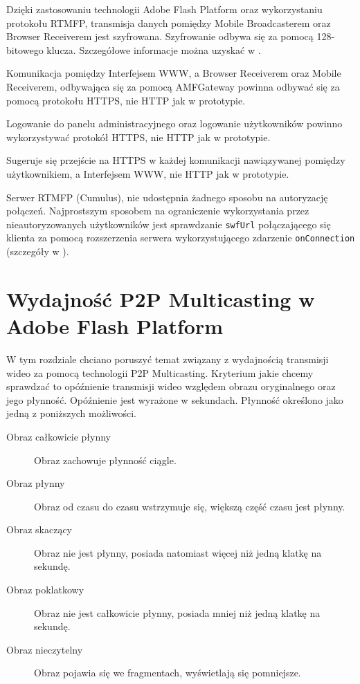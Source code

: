 \begin{packed_item}
    \item{Dzięki zastosowaniu technologii Adobe Flash Platform oraz wykorzystaniu protokołu RTMFP, transmisja danych pomiędzy Mobile Broadcasterem oraz Browser Receiverem jest szyfrowana. Szyfrowanie odbywa się za pomocą 128-bitowego klucza. Szczegółowe informacje można uzyskać w \cite{AdobeSecurity}}.
    \item{Komunikacja pomiędzy Interfejsem WWW, a Browser Receiverem oraz Mobile Receiverem, odbywająca się za pomocą AMFGateway powinna odbywać się za pomocą protokołu HTTPS, nie HTTP jak w prototypie.}
    \item{Logowanie do panelu administracyjnego oraz logowanie użytkowników powinno wykorzystywać protokół HTTPS, nie HTTP jak w prototypie.}
    \item{Sugeruje się przejście na HTTPS w każdej komunikacji nawiązywanej pomiędzy użytkownikiem, a Interfejsem WWW, nie HTTP jak w prototypie.}
    \item{Serwer RTMFP (Cumulus), nie udostępnia żadnego sposobu na autoryzację połączeń. Najprostszym sposobem na ograniczenie wykorzystania przez nieautoryzowanych użytkowników jest sprawdzanie \texttt{swfUrl} połączającego się klienta za pomocą rozszerzenia serwera wykorzystującego zdarzenie \texttt{onConnection} (szczegóły w \cite{CumulusDocs}).}
\end{packed_item}

\newpage
\section{Wydajność P2P Multicasting w Adobe Flash Platform}

W tym rozdziale chciano poruszyć temat związany z wydajnością transmisji wideo za pomocą technologii P2P Multicasting. Kryterium jakie chcemy sprawdzać to opóźnienie transmisji wideo względem obrazu oryginalnego oraz jego płynność. Opóźnienie jest wyrażone w sekundach. Płynność określono jako jedną z poniższych możliwości.
\begin{description}
    \item[Obraz całkowicie płynny] Obraz zachowuje płynność ciągle.
    \item[Obraz płynny] Obraz od czasu do czasu wstrzymuje się, większą część czasu jest płynny.
    \item[Obraz skaczący] Obraz nie jest płynny, posiada natomiast więcej niż jedną klatkę na sekundę.
    \item[Obraz poklatkowy] Obraz nie jest całkowicie płynny, posiada mniej niż jedną klatkę na sekundę.
    \item[Obraz nieczytelny] Obraz pojawia się we fragmentach, wyświetlają się pomniejsze.
\end{description}

